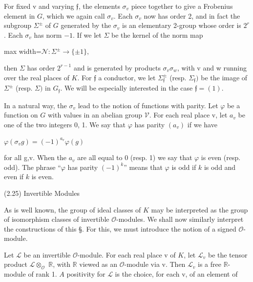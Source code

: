 \documentclass[11pt]{article}
\newcommand{\DFormula}[1]{\par\smallskip\noindent\begin{adjustbox}{max width=\linewidth}$\displaystyle #1$\end{adjustbox}\par\smallskip}
\begin{document}
\par
For fixed v and varying \(𝔣\), the elements \(\sigma _{v}\) piece together to give a Frobenius element in \(G\), which we again call \(\sigma _{v}\). Each \(\sigma _{v}\) now has order 2, and in fact the subgroup \(\Sigma ^{\pm }\) of \(G\) generated by the \(\sigma _{v}\) is an elementary 2-group whose order is \(2^{r}\). Each \(\sigma _{v}\) has norm \(-1\). If we let \(\Sigma \) be the kernel of the norm map\par
\par
\DFormula{\mathcal{N}:\Sigma ^{\pm }\to \lbrace \pm 1\rbrace ,}
\par
then \(\Sigma \) has order \(2^{r-1}\) and is generated by products \(\sigma _{v}\sigma _{w}\), with v and w running over the real places of \(K\). For \(𝔣\) a conductor, we let \(\Sigma _{𝔣}^{\pm }\) (resp. \(\Sigma _{𝔣})\) be the image of \(\Sigma ^{\pm }\) (resp. \(\Sigma )\) in \(G_{𝔣}\). We will be especially interested in the case \(𝔣=(1)\).\par
\par
In a natural way, the \(\sigma _{v}\) lead to the notion of functions with parity. Let \(\varphi \) be a function on \(G\) with values in an abelian group \(\mathcal{V}\). For each real place v, let \(a_{v}\) be one of the two integers 0, 1. We say that \(\varphi \) has parity \((a_{v})\) if we have\par
\par
\(\varphi (\sigma _{v}g)=(-1)^{a_{v}}\varphi (g)\)\par
\par
for all g,v. When the \(a_{v}\) are all equal to 0 (resp. 1) we say that \(\varphi \) is even (resp. odd). The phrase “\(\varphi \) has parity \((-1)^{k}\)” means that \(\varphi \) is odd if \(k\) is odd and even if \(k\) is even.\par
\par
(2.25) Invertible Modules\par
\par
As is well known, the group of ideal classes of \(K\) may be interpreted as the group of isomorphism classes of invertible \(\mathcal{O}\)-modules. We shall now similarly interpret the constructions of this §. For this, we must introduce the notion of a signed \(\mathcal{O}\)-module.\par
\par
Let \(\mathcal{L}\) be an invertible \(\mathcal{O}\)-module. For each real place v of \(K\), let \(\mathcal{L}_{v}\) be the tensor product \(\mathcal{L}\otimes _{\mathcal{O}}\) \(\mathbb{R}\), with \(\mathbb{R}\) viewed as an \(\mathcal{O}\)-module via v. Then \(\mathcal{L}_{v}\) is a free \(\mathbb{R}\)-module of rank 1. \(A\) positivity for \(\mathcal{L}\) is the choice, for each v, of an element of\par
\end{document}
